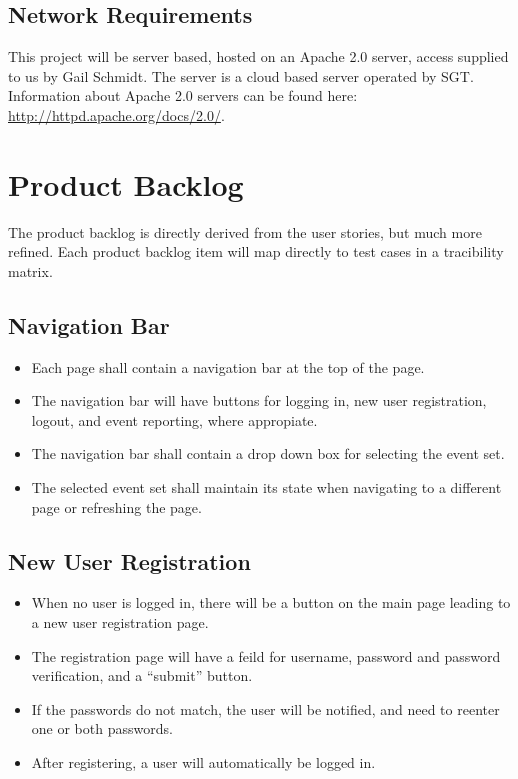 \subsection{Network Requirements}
This project will be server based, hosted on an Apache 2.0 server, access supplied to us by Gail Schmidt. The server is a cloud based server operated by SGT. Information about Apache 2.0 servers can be found here: \url{http://httpd.apache.org/docs/2.0/}. 

\section{Product Backlog}
The product backlog is directly derived from the user stories, but much more refined. Each product backlog item will map directly to test cases in a tracibility matrix.

\subsection{Navigation Bar}
\begin{itemize}
\item Each page shall contain a navigation bar at the top of the page.
\item The navigation bar will have buttons for logging in, new user registration, logout, and event reporting, where appropiate.
\item The navigation bar shall contain a drop down box for selecting the event set.
\item The selected event set shall maintain its state when navigating to a different page or refreshing the page.
\end{itemize}

\subsection{New User Registration}
\begin{itemize}
\item When no user is logged in, there will be a button on the main page leading to a new user registration page.
\item The registration page will have a feild for username, password and password verification, and a ``submit'' button.
\item If the passwords do not match, the user will be notified, and need to reenter one or both passwords.
\item After registering, a user will automatically be logged in.
\end{itemize}

